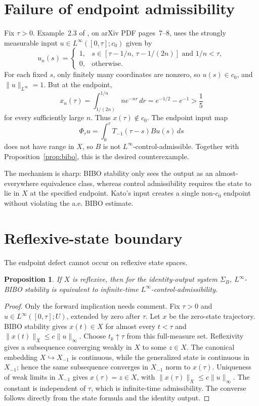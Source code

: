 \documentclass[11pt]{article}
\newtheorem{proposition}[theorem]{Proposition}
\begin{document}
\section{Failure of endpoint admissibility}
\enlargethispage{7\baselineskip}

Fix $\tau>0$.  Example~2.3 of \cite{support}, on arXiv PDF pages~7--8,
uses the strongly measurable input $u\in L^\infty([0,\tau];c_0)$ given by
\[
 u_n(s)=
 \begin{cases}
 1,&s\in[\tau-1/n,\,\tau-1/(2n)]\text{ and }1/n<\tau,\\
 0,&\text{otherwise}.
 \end{cases}
\]
For each fixed $s$, only finitely many coordinates are nonzero, so
$u(s)\in c_0$, and $\|u\|_{L^\infty}=1$.  But at the endpoint,
\[
 x_n(\tau)
 =\int_{1/(2n)}^{1/n} n e^{-nr}\,dr
 =e^{-1/2}-e^{-1}>\frac15
\]
for every sufficiently large $n$.  Thus $x(\tau)\notin c_0$.  The endpoint
input map
\[
 \Phi_\tau u=\int_0^\tau T_{-1}(\tau-s)Bu(s)\,ds
\]
does not have range in $X$, so $B$ is not $L^\infty$-control-admissible.
Together with Proposition~\ref{prop:bibo}, this is the desired counterexample.

The mechanism is sharp: BIBO stability only sees the output as an almost-
everywhere equivalence class, whereas control admissibility requires the state
to lie in $X$ at the specified endpoint.  Kato's input creates a single
non-$c_0$ endpoint without violating the a.e. BIBO estimate.

\section{Reflexive-state boundary}

The endpoint defect cannot occur on reflexive state spaces.

\begin{proposition}\label{prop:reflexive}
If $X$ is reflexive, then for the identity-output system $\Sigma_B$,
$L^\infty$-BIBO stability is equivalent to infinite-time
$L^\infty$-control-admissibility.
\end{proposition}

\begin{proof}
Only the forward implication needs comment.  Fix $\tau>0$ and
$u\in L^\infty([0,\tau];U)$, extended by zero after $\tau$.  Let $x$ be the
zero-state trajectory.  BIBO stability gives $x(t)\in X$ for almost every
$t<\tau$ and $\|x(t)\|_X\le c\|u\|_\infty$.  Choose $t_k\uparrow\tau$ from
this full-measure set.  Reflexivity gives a subsequence converging weakly in
$X$ to some $z\in X$.  The canonical embedding $X\hookrightarrow X_{-1}$ is
continuous, while the generalized state is continuous in $X_{-1}$; hence the
same subsequence converges in $X_{-1}$ norm to $x(\tau)$.  Uniqueness of weak
limits in $X_{-1}$ gives $x(\tau)=z\in X$, with
$\|x(\tau)\|_X\le c\|u\|_\infty$.  The constant is independent of $\tau$,
which is infinite-time admissibility.  The converse follows directly from
the state formula and the identity output.
\end{proof}
\end{document}
